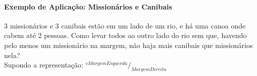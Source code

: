 \newcommand{\sfrac}[2]{$^{#1}/_{#2}$}%
\newcommand{\canoaEsq}[2]{\sfrac{c#1}{#2}}%
\newcommand{\canoaDir}[2]{\sfrac{#1}{#2c}}%
\begin{frame}
	\framesubtitle{Exemplo de Aplicação: Missionários e Canibais}

	3 missionários e 3 canibais estão em um lado de um rio, e há uma canoa onde 
	cabem até 2 pessoas. Como levar todos ao outro lado do rio sem que, havendo 
	pelo menos um missionário na margem, não haja mais canibais que missionários 
	nela?
	\\\vfill\pause
	Supondo a representação: \LARGE \canoaEsq{MargemEsquerda}{MargemDireita}
\end{frame}

\newcommand{\ellipse}[2][blue]{%
	\draw[line width=1pt,#1] (#2) ellipse [x radius=1cm,y radius=.5cm];
}

